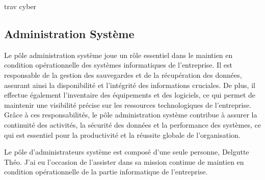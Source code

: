 trav cyber


\subsection{Administration Système}
Le pôle administration système joue un rôle essentiel dans le maintien en condition opérationnelle des systèmes informatiques de l'entreprise.
Il est responsable de la gestion des sauvegardes et de la récupération des données, assurant ainsi la disponibilité et l'intégrité des informations cruciales.
De plus, il effectue également l'inventaire des équipements et des logiciels, ce qui permet de maintenir une visibilité précise sur les ressources technologiques de l'entreprise.
Grâce à ces responsabilités, le pôle administration système contribue à assurer la continuité des activités, la sécurité des données et la performance des systèmes, ce qui est essentiel pour la productivité et la réussite globale de l'organisation.

Le pôle d'administrateurs système est composé d'une seule personne, Delgutte Théo.
J'ai eu l'occasion de l'assister dans sa mission continue de maintien en condition opérationnelle de la partie informatique de l'entreprise.


